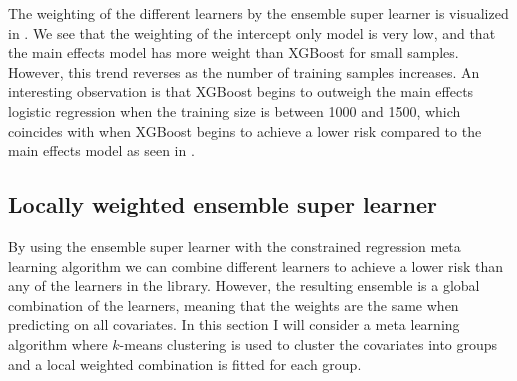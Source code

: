\documentclass[./main.tex]{subfiles}
\begin{document}
The weighting of the different learners by the ensemble super learner is visualized in . We see that the weighting of the intercept only model is very low, and that the main effects model has more weight than XGBoost for small samples. However, this trend reverses as the number of training samples increases. An interesting observation is that XGBoost begins to outweigh the main effects logistic regression when the training size is between 1000 and 1500, which coincides with when XGBoost begins to achieve a lower risk compared to the main effects model as seen in .

\subsection{Locally weighted ensemble super learner} \label{locally_weighted_ensemble_super_learner}
By using the ensemble super learner with the constrained regression meta learning algorithm we can combine different learners to achieve a lower risk than any of the learners in the library. However, the resulting ensemble is a global combination of the learners, meaning that the weights are the same when predicting on all covariates. In this section I will consider a meta learning algorithm where $ k $-means clustering is used to cluster the covariates into groups and a local weighted combination is fitted for each group.
\end{document}
